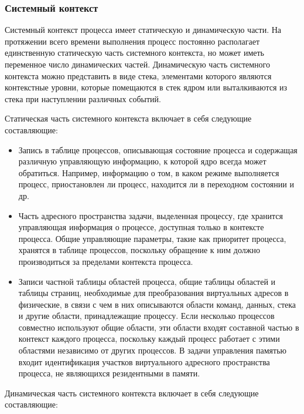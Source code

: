 \documentclass[14pt,a4paper,report]{report}
\begin{document}
\subsubsection{Системный контекст}

Системный контекст процесса имеет статическую и динамическую части. На протяжении всего времени выполнения процесс постоянно располагает единственную статическую часть системного контекста, но может иметь переменное число динамических частей. Динамическую часть системного контекста можно представить в виде стека, элементами которого являются контекстные уровни, которые помещаются в стек ядром или выталкиваются из стека при наступлении различных событий.

Статическая часть системного контекста включает в себя следующие составляющие:

\begin{itemize}
	\item Запись в таблице процессов, описывающая состояние процесса и содержащая различную управляющую информацию, к которой ядро всегда может обратиться. Например, информацию о том, в каком режиме выполняется процесс, приостановлен ли процесс, находится ли в переходном состоянии и др.
	\item Часть адресного пространства задачи, выделенная процессу, где хранится управляющая информация о процессе, доступная только в контексте процесса. Общие управляющие параметры, такие как приоритет процесса, хранятся в таблице процессов, поскольку обращение к ним должно производиться за пределами контекста процесса.
	\item Записи частной таблицы областей процесса, общие таблицы областей и таблицы страниц, необходимые для преобразования виртуальных адресов в физические, в связи с чем в них описываются области команд, данных, стека и другие области, принадлежащие процессу. Если несколько процессов совместно используют общие области, эти области входят составной частью в контекст каждого процесса, поскольку каждый процесс работает с этими областями независимо от других процессов. В задачи управления памятью входит идентификация участков виртуального адресного пространства процесса, не являющихся резидентными в памяти.
\end{itemize}

Динамическая часть системного контекста включает в себя следующие составляющие:
\end{document}

